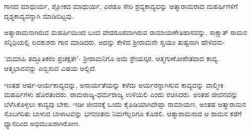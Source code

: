 ಗಾನದ ಮಾಧುರ್ಯ, ಶ್ಲೋಕದ ಮಾಧುರ್ಯ, ಎರಡೂ ಸೇರಿ ಶ್ರವ್ಯಕಾವ್ಯವನ್ನು ಆತ್ಮಾರಾಮರಾದ ಮಹರ್ಷಿಗಳಿಗೆ ದೃಶ್ಯಕಾವ್ಯವನ್ನಾಗಿ ಮಾಡಿಬಿಟ್ಟವು. 


ಆತ್ಮಾರಾಮನಾಗಿರುವ ಮಹರ್ಷಿಯಿಂದ ಬಂದ ವೇದರೂಪವಾಗಿರುವ ರಾಮಾಯಣೇತಿಹಾಸವನ್ನು, ಸಾಕ್ಷಾತ್‍ ರಾಮನ ಸನ್ನಿಧಿಯಲ್ಲಿ ಲವಕುಶರು ಗಾನ ಮಾಡಿದರು. ಅದನ್ನು ಕೇಳಿದ ಶ್ರೀರಾಮನೇ ಸ್ವಯಂ ತುಷ್ಟನಾಗಿ ಹೇಳಿದನು- 


`ಮಮಾಪಿ ತದ್ಭೂತಿಕರಂ ಪ್ರಚಕ್ಷತೇ'- ಶ್ರೀರಾಮನಿಗೂ ಅದು ಶ್ರೇಯಸ್ಕರ. ಆತ್ಮಗುಣೋಪೇತವಾದ ಕಾವ್ಯ. ಆತ್ಮಭಾವವನ್ನು ಎಬ್ಬಿಸುವ ವಿಷಯ ಅಲ್ಲಿದೆ. 


ಇಂತಹ ಆರ್ಷ-ಆರ್ಯಕಾವ್ಯವನ್ನು, ಅನಾರ್ಯತೆಯನ್ನು ಕಳೆದು ಆರ್ಯರನ್ನಾಗಿಸುವ ಕಾವ್ಯವನ್ನು ವಾಲ್ಮೀಕಿ ಮಹರ್ಷಿಗಳು ಹೊರತಂದರು. ರಾಮರಾಜ್ಯ-ಧರ್ಮರಾಜ್ಯ ಉಳಿಯಲಿ ಎಂದು ರಚಿಸಿದರು. ಅಂತಹ ಜೀವನವನ್ನು ಬೆಳೆಸಿಕೊಳ್ಳಲು ಕಾವ್ಯವು ಬೇಕು. ಇಡೀ ಜೀವನಕ್ಕೆ ಒಂದು ಕೈಪಿಡಿಯಾಗಿದೇಪ್ಪಾ ರಾಮಾಯಣ. ಅಂತಹ ಆತ್ಮಾರಾಮನ ಸೊಬಗರಿತು ಬಾಳುವ ಬಾಳಾಟವನ್ನು ಭಗವಂತನು ನಿಮಗೆಲ್ಲರಿಗೂ ಕೊಡಲಿ. ಆತ್ಮಾರಾಮನಾದ ಆ ರಾಮನ ಕಡೆಗೆ ಧ್ಯಾನದಿಂದ ಅಭಿಮುಖರಾಗಿರೋಣ. 
